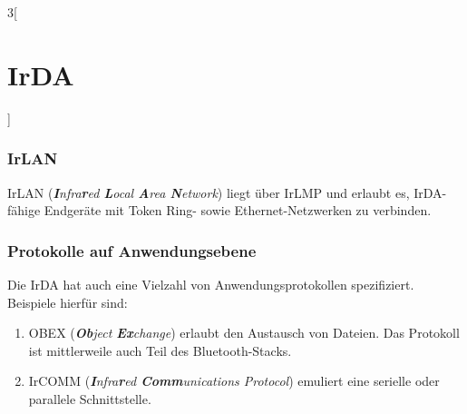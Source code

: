 \begin{multicols}{3}[\section{IrDA}]
\subsubsection*{IrLAN}
IrLAN (\textit{\textbf{I}nfra\textbf{r}ed \textbf{L}ocal \textbf{A}rea \textbf{N}etwork}) liegt über IrLMP und erlaubt es, IrDA-fähige Endgeräte mit Token Ring- sowie Ethernet-Netzwerken zu verbinden.

\subsubsection*{Protokolle auf Anwendungsebene}
Die IrDA hat auch eine Vielzahl von Anwendungsprotokollen spezifiziert. Beispiele hierfür sind:
\begin{enumerate}
	\item OBEX (\textit{\textbf{Ob}ject \textbf{Ex}change}) erlaubt den Austausch von Dateien. Das Protokoll ist mittlerweile auch Teil des Bluetooth-Stacks.
	\item IrCOMM (\textit{\textbf{I}nfra\textbf{r}ed \textbf{Comm}unications Protocol}) emuliert eine serielle oder parallele Schnittstelle.
\end{enumerate}

\end{multicols}
\newpage
